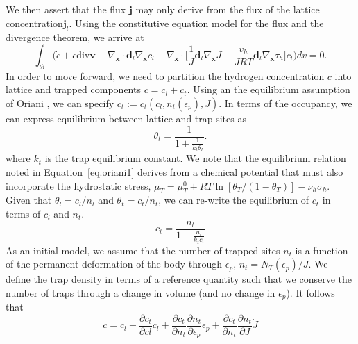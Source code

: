 \documentclass[10pt]{elsarticle}
\newcommand{\mbs}[1]{\boldsymbol{#1}}
\def\bs{{\mbs{s}}} \def\bt{{\mbs{t}}} \def\bu{{\mbs{u}}}
\def\bs{\boldsymbol}
\begin{document}
We then assert that the flux $\bs{j}$ may only derive from the flux of the lattice concentration$\bs{j}_{l}$. Using the constitutive equation model for the flux and the divergence theorem, we arrive at 
%
\begin{equation}
\label{eq.hconservation3}  \int_{\mathcal{B}} \bigg( \dot{c} + c\text{div}\bs{v} - \nabla_{\bs{x}} \cdot \bs{d}_{l} \nabla_{\bs{x}}c_{l}   -  \nabla_{\bs{x}} \cdot \bigg[ \frac{1}{J} \bs{d}_{l} \nabla_{\bs{x}}J -  \frac{v_{h}}{JR T} \bs{d}_{l} \nabla_{\bs{x}}\tau_{h}\bigg] c_{l} \bigg) dv = 0.
\end{equation}
%
In order to move forward, we need to partition the hydrogen concentration $c$ into lattice and trapped components $c = c_{l} + c_{t}$. Using an the equilibrium assumption of Oriani \cite{Oriani1970}, we can specify $c_{t} := \bar{c}_{t}(c_{l}, n_t(\epsilon_{p}), J)$. In terms of the occupancy, we can express equilibrium between lattice and trap sites as
%
\begin{equation}
\label{eq.oriani1} \theta_{t} = \frac{1}{1 + \frac{1}{k_{t} \theta_{l}}}.
\end{equation}
where $k_t$ is the trap equilibrium constant.  We note that the equilibrium relation noted in Equation~\ref{eq.oriani1} derives from a chemical potential that must also incorporate the hydrostatic stress, $\mu_{T} =  \mu_{T}^{0} + RT\ln[\theta_{T}/(1-\theta_{T})] - \nu_{h}\sigma_{h} $. Given that $\theta_{l} = c_{l}/n_{l}$ and $\theta_{t} = c_{t}/n_{t}$, we can re-write the equilibrium of $c_{t}$ in terms of $c_{l}$ and $n_{t}$. 
%
\begin{equation}
\label{eq.oriani2} c_{t} = \frac{n_{t}}{1 + \frac{n_{l}}{k_{t} c_{l}}}
\end{equation}
As an initial model, we assume that the number of trapped sites $n_{t}$ is a function of the permanent deformation of the body through $\epsilon_{p}$, $n_{t} = N_{T}(\epsilon_{p})/J$. We define the trap density in terms of a reference quantity such that we conserve the number of traps through a change in volume (and no change in $\epsilon_{p}$).  It follows that
%
\begin{equation}
\label{eq.cdot2}{\dot{c} = \dot{c}_{l} + \frac{\partial c_{t}}{\partial c{l}} \dot{c}_{l} + \frac{\partial c_{t}}{\partial n_{t}} \frac{\partial n_{t}}{\partial \epsilon_{p}} \dot{\epsilon}_{p}} +  \frac{\partial c_{t}}{\partial n_{t}} \frac{\partial n_{t}}{\partial J} \dot{J}
\end{equation}
\end{document}
